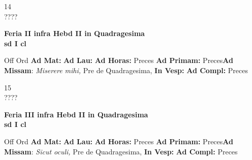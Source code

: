 \documentclass[10pt, openany]{book}
\begin{document}
    \begin{center}
        \begin{minipage}{3.5in}
            \vspace{2em}
            \begin{minipage}{0.5in}
                {\Huge 14} \\
                {\normalsize ????}
            \end{minipage}
            \begin{minipage}{3.0in}
                \textbf{ \large Feria II infra Hebd II in Quadragesima \\
                \textnormal{\normalsize sd I cl}}

            \end{minipage}
            \begin{justify}Off Ord
                \textbf{Ad Mat: }
                \textbf{Ad Lau: }
                \textbf{Ad Horas: }Preces
                \textbf{Ad Primam: }Preces\textbf{Ad Missam}: \textit{Miserere mihi,} Pre de Quadragesima, 
                \textbf{In Vesp: }
                \textbf{Ad Compl: }Preces
            \end{justify}
        \end{minipage}
    \end{center}

    \begin{center}
        \begin{minipage}{3.5in}
            \vspace{2em}
            \begin{minipage}{0.5in}
                {\Huge 15} \\
                {\normalsize ????}
            \end{minipage}
            \begin{minipage}{3.0in}
                \textbf{ \large Feria III infra Hebd II in Quadragesima \\
                \textnormal{\normalsize sd I cl}}

            \end{minipage}
            \begin{justify}Off Ord
                \textbf{Ad Mat: }
                \textbf{Ad Lau: }
                \textbf{Ad Horas: }Preces
                \textbf{Ad Primam: }Preces\textbf{Ad Missam}: \textit{Sicut oculi,} Pre de Quadragesima, 
                \textbf{In Vesp: }
                \textbf{Ad Compl: }Preces
            \end{justify}
        \end{minipage}
    \end{center}
\end{document}
